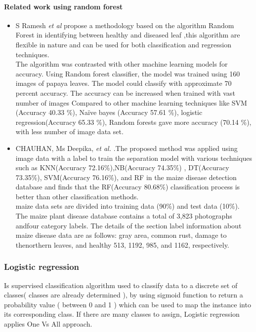 \paragraph{Related work using random forest}
\begin{itemize}
    \item S Ramesh \textit{et al} \cite{art8}  propose a methodology based on the algorithm Random Forest in identifying between healthy and diseased leaf ,this algorithm are flexible in nature and can be used for both classification and regression techniques.\\\vspace{4mm}
    The algorithm was contrasted with other machine learning models for accuracy. Using Random forest classifier, the model was trained using 160 images of papaya leaves. The model could classify with approximate 70 percent accuracy. The accuracy can be increased when trained with vast number of images
Compared to other machine learning techniques like SVM (Accuracy 40.33 \%), Naïve bayes (Accuracy 57.61 \%),  logistic regression(Accuracy 65.33 \%),  Random forests gave more accuracy (70.14 \%), with less number of image data set.

\item CHAUHAN, Ms Deepika, \textit{et al.} \cite{art9}.The  proposed  method  was  applied  using  image  data  with  a  label  to  train  the  separation model with various techniques such as  KNN(Accuracy 72.16\%),NB(Accuracy 74.35\%) , DT(Accuracy 73.35\%), SVM(Accuracy 76.16\%), and RF in the maize disease  detection database and finds that  the RF(Accuracy 80.68\%) classification process is better than other classification  methods.\\ \vspace{4mm}
maize  data  sets  are  divided  into  training  data  (90\%)  and  test  data  (10\%).  The maize plant disease  database contains a  total of 3,823 photographs andfour category labels.  The  details of the section  label  information  about  maize  disease  data  are  as  follows:  gray  area,  common  rust,  damage  to  thenorthern leaves,  and healthy 513, 1192, 985, and 1162, respectively.
\end{itemize}
\subsubsection{Logistic regression}
Is supervised classification algorithm used to classify data to a discrete set of classes(
classes are already determined ), by using sigmoid function to return a probability
value ( between 0 and 1 ) which can be used to map the instance into its corresponding
class. If there are many classes to assign, Logistic regression applies One Vs All approach.\\

